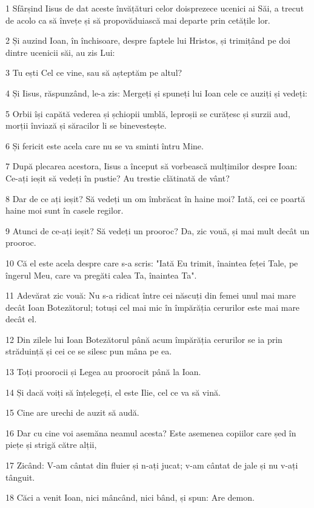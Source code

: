 \par 1 Sfârșind Iisus de dat aceste învățături celor doisprezece ucenici ai Săi, a trecut de acolo ca să învețe și să propovăduiască mai departe prin cetățile lor.
\par 2 Și auzind Ioan, în închisoare, despre faptele lui Hristos, și trimițând pe doi dintre ucenicii săi, au zis Lui:
\par 3 Tu ești Cel ce vine, sau să așteptăm pe altul?
\par 4 Și Iisus, răspunzând, le-a zis: Mergeți și spuneți lui Ioan cele ce auziți și vedeți:
\par 5 Orbii își capătă vederea și șchiopii umblă, leproșii se curățesc și surzii aud, morții înviază și săracilor li se binevestește.
\par 6 Și fericit este acela care nu se va sminti întru Mine.
\par 7 După plecarea acestora, Iisus a început să vorbească mulțimilor despre Ioan: Ce-ați ieșit să vedeți în pustie? Au trestie clătinată de vânt?
\par 8 Dar de ce ați ieșit? Să vedeți un om îmbrăcat în haine moi? Iată, cei ce poartă haine moi sunt în casele regilor.
\par 9 Atunci de ce-ați ieșit? Să vedeți un prooroc? Da, zic vouă, și mai mult decât un prooroc.
\par 10 Că el este acela despre care s-a scris: "Iată Eu trimit, înaintea feței Tale, pe îngerul Meu, care va pregăti calea Ta, înaintea Ta".
\par 11 Adevărat zic vouă: Nu s-a ridicat între cei născuți din femei unul mai mare decât Ioan Botezătorul; totuși cel mai mic în împărăția cerurilor este mai mare decât el.
\par 12 Din zilele lui Ioan Botezătorul până acum împărăția cerurilor se ia prin străduință și cei ce se silesc pun mâna pe ea.
\par 13 Toți proorocii și Legea au proorocit până la Ioan.
\par 14 Și dacă voiți să înțelegeți, el este Ilie, cel ce va să vină.
\par 15 Cine are urechi de auzit să audă.
\par 16 Dar cu cine voi asemăna neamul acesta? Este asemenea copiilor care șed în piețe și strigă către alții,
\par 17 Zicând: V-am cântat din fluier și n-ați jucat; v-am cântat de jale și nu v-ați tânguit.
\par 18 Căci a venit Ioan, nici mâncând, nici bând, și spun: Are demon.
